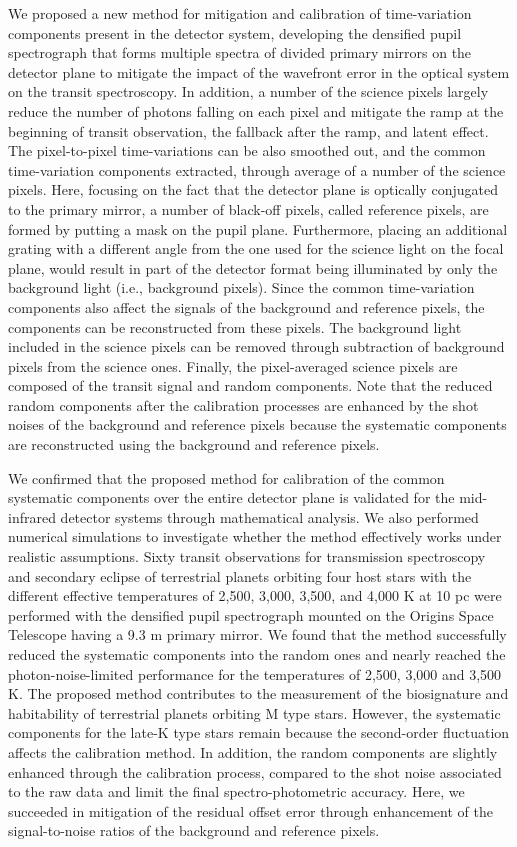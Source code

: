 \documentclass{aastex62}
\begin{document}
We proposed a new method for mitigation and calibration of time-variation components present in the detector system, developing the densified pupil spectrograph that forms multiple spectra of divided primary mirrors on the detector plane to mitigate the impact of the wavefront error in the optical system on the transit spectroscopy. In addition, a number of the science pixels largely reduce the number of photons falling on each pixel and mitigate the ramp at the beginning of transit observation, the fallback after the ramp, and latent effect. The pixel-to-pixel time-variations can be also smoothed out, and the common time-variation components extracted, through average of a number of the science pixels. Here, focusing on the fact that the detector plane is optically conjugated to the primary mirror, a number of black-off pixels, called reference pixels, are formed by putting a mask on the pupil plane. Furthermore, placing an additional grating with a different angle from the one used for the science light on the focal plane, would result in part of the detector format being illuminated by only the background light (i.e., background pixels). Since the common time-variation components also affect the signals of the background and reference pixels, the components can be reconstructed from these pixels. The background light included in the science pixels can be removed through subtraction of background pixels from the science ones. Finally, the pixel-averaged science pixels are composed of the transit signal and random components. Note that the reduced random components after the calibration processes are enhanced by the shot noises of the background and reference pixels because the systematic components are reconstructed using the background and reference pixels.

We confirmed that the proposed method for calibration of the common systematic components over the entire detector plane is validated for the mid-infrared detector systems through mathematical analysis. We also performed numerical simulations to investigate whether the method effectively works under realistic assumptions. Sixty transit observations for transmission spectroscopy and secondary eclipse of terrestrial planets orbiting four host stars with the different effective temperatures of 2,500, 3,000, 3,500, and 4,000 K at 10 pc were performed with the densified pupil spectrograph mounted on the Origins Space Telescope having a 9.3 m primary mirror. We found that the method successfully reduced the systematic components into the random ones and nearly reached the photon-noise-limited performance for the temperatures of 2,500, 3,000 and 3,500 K. The proposed method contributes to the measurement of the biosignature and habitability of terrestrial planets orbiting M type stars. However, the systematic components for the late-K type stars remain because the second-order fluctuation affects the calibration method. In addition, the random components are slightly enhanced through the calibration process, compared to the shot noise associated to the raw data and limit the final spectro-photometric accuracy. Here, we succeeded in mitigation of the residual offset error through enhancement of the signal-to-noise ratios of the background and reference pixels.
\end{document}
